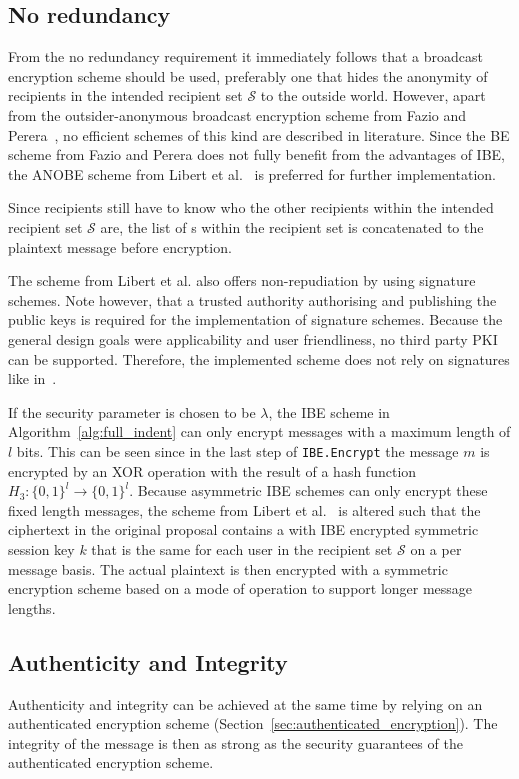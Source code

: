 \subsection{No redundancy}
From the no redundancy requirement it immediately follows that a broadcast encryption scheme should be used, preferably one that hides the anonymity of recipients in the intended recipient set $\mathcal{S}$ to the outside world. However, apart from the outsider-anonymous broadcast encryption scheme from Fazio and Perera~\cite{art:FazioP12}, no efficient schemes of this kind are described in literature. Since the BE scheme from Fazio and Perera does not fully benefit from the advantages of IBE, the ANOBE scheme from Libert et al.~\cite{art:LibertPQ12} is preferred for further implementation.

Since recipients still have to know who the other recipients within the intended recipient set $\mathcal{S}$ are, the list of \id{}s within the recipient set is concatenated to the plaintext message before encryption.

The scheme from Libert et al. also offers non-repudiation by using signature schemes. Note however, that a trusted authority authorising and publishing the public keys is required for the implementation of signature schemes. Because the general design goals were applicability and user friendliness, no third party PKI can be supported. Therefore, the implemented scheme does not rely on signatures like in~\cite{art:LibertPQ12}.

If the security parameter is chosen to be $\lambda$, the IBE scheme in Algorithm~\ref{alg:full_indent} can only encrypt messages with a maximum length of $l$ bits. This can be seen since in the last step of \texttt{IBE.Encrypt} the message $m$ is encrypted by an XOR operation with the result of a hash function $H_3: \{ 0,1 \}^l \rightarrow \{ 0,1 \}^l$. Because asymmetric IBE schemes can only encrypt these fixed length messages, the scheme from Libert et al.~\cite{art:LibertPQ12} is altered such that the ciphertext in the original proposal contains a with IBE encrypted symmetric session key $k$ that is the same for each user in the recipient set $\mathcal{S}$ on a per message basis. The actual plaintext is then encrypted with a symmetric encryption scheme based on a mode of operation to support longer message lengths.

\subsection{Authenticity and Integrity}
\label{sec:authenticity_and_integrity}
Authenticity and integrity can be achieved at the same time by relying on an authenticated encryption scheme (Section~\ref{sec:authenticated_encryption}). The integrity of the message is then as strong as the security guarantees of the authenticated encryption scheme. 

